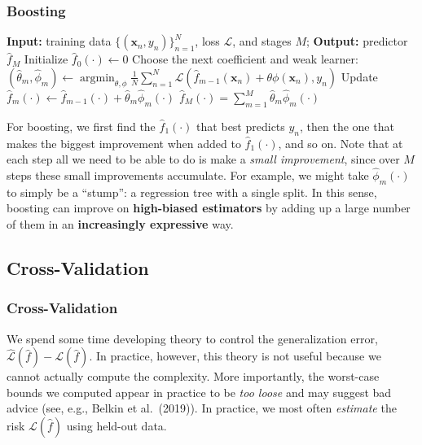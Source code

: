 \subsubsection{Boosting}
\begin{algorithm}[H]
\caption{Forward stagewise additive modeling}
\label{alg:forward-stagewise}
\begin{algorithmic}
  \Statex \textbf{Input:} training data $\{(\boldsymbol{x}_n,y_n)\}_{n=1}^{N}$,
    loss $\mathcal{L}$, and stages $M$; \quad
    \textbf{Output:} predictor $\hat{f}_M$
  \State Initialize $\hat{f}_0(\cdot) \gets 0$
    \State Choose the next coefficient and weak learner:
    \Statex \hspace{\algorithmicindent}$\displaystyle
      (\hat{\theta}_m,\hat{\phi}_m)
      \gets \operatorname*{argmin}_{\theta,\phi}
      \frac{1}{N}\sum_{n=1}^{N}
      \mathcal{L}\!\left(
        \hat{f}_{m-1}(\boldsymbol{x}_n)
        + \theta\phi(\boldsymbol{x}_n),y_n
      \right)$
    \State Update $\hat{f}_m(\cdot) \gets \hat{f}_{m-1}(\cdot)
      + \hat{\theta}_m\hat{\phi}_m(\cdot)$
  \EndFor
  \State \Return $\displaystyle \hat{f}_M(\cdot)
    = \sum_{m=1}^{M}\hat{\theta}_m\hat{\phi}_m(\cdot)$
\end{algorithmic}
\end{algorithm}
For boosting, we first find the $\hat{f}_1(\cdot)$ that best
predicts $y_n$, then the one that makes the biggest improvement when
added to $\hat{f}_1(\cdot)$, and so on. Note that at each step all we
need to be able to do is make a \emph{small improvement}, since over
$M$ steps these small improvements accumulate. For example, we might
take $\hat{\phi}_m(\cdot)$ to simply be a ``stump'': a regression
tree with a single split. In this sense, boosting can improve on
\textbf{high-biased estimators} by adding up a large number of them in an
\textbf{increasingly expressive} way.

\subsection{Cross-Validation}
\subsubsection{Cross-Validation}
We spend some time developing theory to control the generalization
error, $\hat{\mathcal{L}}(\hat{f}) - \mathcal{L}(\hat{f})$. In
practice, however, this theory is not useful because we cannot
actually compute the complexity. More importantly, the worst-case
bounds we computed appear in practice to be \emph{too loose} and may
suggest bad advice (see, e.g., Belkin et al.\ (2019)). In practice,
we most often \emph{estimate} the risk $\mathcal{L}(\hat{f})$ using
held-out data.

